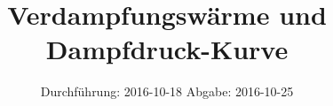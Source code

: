 

\subject{V203}
\title{Verdampfungswärme und Dampfdruck-Kurve}
\date{
	Durchführung: 2016-10-18
	\hspace{3em}
	Abgabe: 2016-10-25
}



\maketitle
\thispagestyle{empty}
\tableofcontents
\newpage


